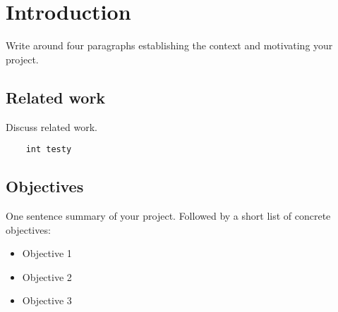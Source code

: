 \section{Introduction}

Write around four paragraphs establishing the context and motivating your project.

\subsection{Related work}

Discuss related work.

\begin{verbatim}
    int testy
\end{verbatim}

\subsection{Objectives}

One sentence summary of your project. Followed by a short list of concrete objectives:

\begin{itemize}
    \item Objective 1
    \item Objective 2
    \item Objective 3
\end{itemize}
